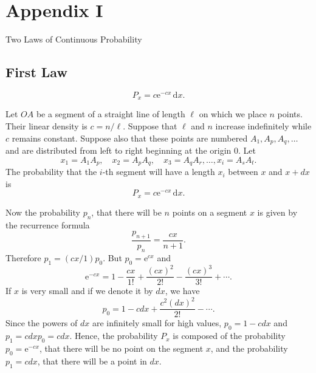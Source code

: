 \documentclass[letterpaper, 11pt]{article}
\begin{document}



%     




%     

\newpage

\section*{Appendix I}

\begin{center}
    \Large Two Laws of Continuous Probability
\end{center}

\subsection*{First Law}

\[P_x = c \mathrm{e}^{-cx} \, \mathrm{d}x.\]

Let \(OA\) be a segment of a straight line of length \(\ell\) on which we place \(n\) points.
Their linear density is \(c = n/\ell\).
Suppose that \(\ell\) and \(n\) increase indefinitely while \(c\) remains constant.
Suppose also that these points are numbered \(A_1, A_p, A_q, \dots\) and are distributed from left to right beginning at the origin \(0\).
Let
\[x_1 = A_1 A_p, \quad x_2 = A_p A_q, \quad x_3 = A_q A_r, \dots, x_i = A_s A_t.\]
The probability that the \(i\)-th segment will have a length \(x_i\) between \(x\) and \(x + dx\) is
\[P_x = c\mathrm{e}^{-cx} \, \mathrm{d}x.\]

Now the probability \(p_n\), that there will be \(n\) points on a segment \(x\) is given by the recurrence formula
\[\frac{p_{n+1}}{p_n} = \frac{cx}{n+1} .\]
Therefore \(p_1 = (cx/1)p_0\).
But \(p_0 = \mathrm{e}^{cx}\) and
\[\mathrm{e}^{-cx} = 1 - \frac{cx}{1!} + \frac{(cx)^2}{2!} - \frac{(cx)^3}{3!} + \cdots .\]
If \(x\) is very small and if we denote it by \(dx\), we have
\[p_0 = 1 - c dx + \frac{c^2 (dx)^2}{2!} - \cdots .\]
Since the powers of \(dx\) are infinitely small for high values, \(p_0 = 1 - c dx\) and \(p_1 = c dx p_0 = c dx\).
Hence, the probability \(P_x\) is composed of the probability \(p_0 = \mathrm{e}^{-cx}\), that there will be no point on the segment \(x\), and the probability \(p_1 = c dx\), that there will be a point in \(dx\).
\end{document}
